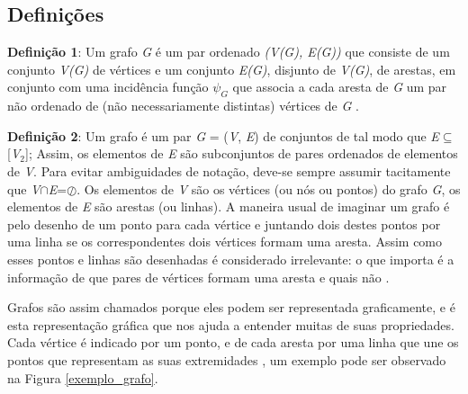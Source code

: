 \subsection{Definições}

\textbf{Definição 1}: Um grafo \textit{G} é um par ordenado \textit{(V(G), E(G))} que consiste de um conjunto \textit{V(G)} de vértices e um conjunto \textit{E(G)}, disjunto de \textit{V(G)}, de arestas, em conjunto com uma incidência função $\psi_G$ que associa a cada aresta de \textit{G} um par não ordenado de (não necessariamente distintas) vértices de \textit{G} \cite{Bondy:2007}.

\textbf{Definição 2}: Um grafo é um par \textit{G} = (\textit{V}, \textit{E}) de conjuntos de tal modo que \textit{E}$\subseteq$[\textit{V}$_2$]; Assim, os elementos de \textit{E} são subconjuntos de pares ordenados de elementos de \textit{V}. Para evitar ambiguidades de notação, deve-se sempre assumir tacitamente que \textit{V}$\cap$\textit{E}=$\oslash$. Os elementos de \textit{V} são os vértices (ou nós ou pontos) do grafo \textit{G}, os elementos de \textit{E} são arestas (ou linhas). A maneira usual de imaginar um grafo é pelo desenho de um ponto para cada vértice e juntando dois destes pontos por uma linha se os correspondentes dois vértices formam uma aresta. Assim como esses pontos e linhas são desenhadas é considerado irrelevante: o que importa é a informação de que pares de vértices formam uma aresta e quais não \cite{Diestel:1997}.

Grafos são assim chamados porque eles podem ser representada graficamente, e é esta representação gráfica que nos ajuda a entender muitas de suas propriedades. Cada vértice é indicado por um ponto, e de cada aresta por uma linha que une os pontos que representam as suas extremidades \cite{Bondy:2007}, um exemplo pode ser observado na Figura \ref{exemplo_grafo}.

